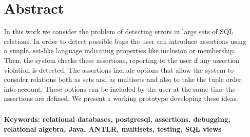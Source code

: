 \documentclass[]{book}
\begin{document}
\newpage\null
{}%
\tableofcontents
\newpage


\chapter*{Abstract}
In this work we consider the problem of detecting errors in large sets of SQL relations. In order to detect possible bugs the user can introduce assertions using a simple, set-like language indicating properties like inclusion or membership. Then, the system checks these assertions, reporting to the user if any assertion violation is detected.
The assertions include options that allow the system to consider relations both as sets and as multisets and also to take the tuple order into account. These options can be included by the user at the same time the assertions are defined. We present a working prototype developing these ideas.
\paragraph{}
\textbf{Keywords: relational databases, postgresql, assertions, debugging, relational algebra, Java, ANTLR, multisets, testing, SQL views}

\newpage

\printbibliography[title = {Referencia}]
\end{document}
